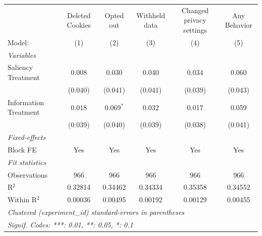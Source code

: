 \begin{tabular}{lccccc}
   \tabularnewline \midrule \midrule
                         & Deleted Cookies & Opted out   & Withheld data & Changed privacy settings & Any Behavior \\   
   Model:                & (1)             & (2)         & (3)           & (4)                      & (5)\\  
   \midrule
   \emph{Variables}\\
   Saliency Treatment    & 0.008           & 0.030       & 0.040         & 0.034                    & 0.060\\   
                         & (0.040)         & (0.041)     & (0.041)       & (0.039)                  & (0.043)\\   
   Information Treatment & 0.018           & 0.069$^{*}$ & 0.032         & 0.017                    & 0.059\\   
                         & (0.039)         & (0.040)     & (0.039)       & (0.038)                  & (0.041)\\   
   \midrule
   \emph{Fixed-effects}\\
   Block FE              & Yes             & Yes         & Yes           & Yes                      & Yes\\  
   \midrule
   \emph{Fit statistics}\\
   Observations          & 966             & 966         & 966           & 966                      & 966\\  
   R$^2$                 & 0.32814         & 0.34462     & 0.34334       & 0.35358                  & 0.34552\\  
   Within R$^2$          & 0.00036         & 0.00495     & 0.00192       & 0.00129                  & 0.00455\\  
   \midrule \midrule
   \multicolumn{6}{l}{\emph{Clustered (experiment\_id) standard-errors in parentheses}}\\
   \multicolumn{6}{l}{\emph{Signif. Codes: ***: 0.01, **: 0.05, *: 0.1}}\\
\end{tabular}
